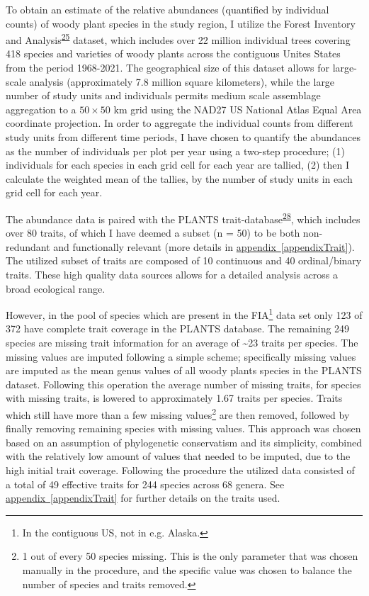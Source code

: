 \documentclass[
  10pt,
]{article}
\newcommand{\aref}[1]{\hyperref[#1]{appendix~\ref*{#1}}}
\begin{document}
To obtain an estimate of the relative abundances (quantified by individual counts) of woody plant species in the study region, I utilize the Forest Inventory and Analysis\textsuperscript{\protect\hyperlink{ref-FIADB}{25}} dataset, which includes over 22 million individual trees covering 418 species and varieties of woody plants across the contiguous Unites States from the period 1968-2021. The geographical size of this dataset allows for large-scale analysis (approximately 7.8 million square kilometers), while the large number of study units and individuals permits medium scale assemblage aggregation to a \(50 \times 50\) km grid using the NAD27 US National Atlas Equal Area coordinate projection. In order to aggregate the individual counts from different study units from different time periods, I have chosen to quantify the abundances as the number of individuals per plot per year using a two-step procedure; (1) individuals for each species in each grid cell for each year are tallied, (2) then I calculate the weighted mean of the tallies, by the number of study units in each grid cell for each year.

The abundance data is paired with the PLANTS trait-database\textsuperscript{\protect\hyperlink{ref-PLANTS}{28}}, which includes over 80 traits, of which I have deemed a subset (n = 50) to be both non-redundant and functionally relevant (more details in \aref{appendixTrait}). The utilized subset of traits are composed of 10 continuous and 40 ordinal/binary traits. These high quality data sources allows for a detailed analysis across a broad ecological range.

However, in the pool of species which are present in the FIA\footnote{In the contiguous US, not in e.g. Alaska.} data set only 123 of 372 have complete trait coverage in the PLANTS database. The remaining 249 species are missing trait information for an average of \textasciitilde23 traits per species. The missing values are imputed following a simple scheme; specifically missing values are imputed as the mean genus values of all woody plants species in the PLANTS dataset. Following this operation the average number of missing traits, for species with missing traits, is lowered to approximately 1.67 traits per species. Traits which still have more than a few missing values\footnote{1 out of every 50 species missing. This is the only parameter that was chosen manually in the procedure, and the specific value was chosen to balance the number of species and traits removed.} are then removed, followed by finally removing remaining species with missing values. This approach was chosen based on an assumption of phylogenetic conservatism and its simplicity, combined with the relatively low amount of values that needed to be imputed, due to the high initial trait coverage. Following the procedure the utilized data consisted of a total of 49 effective traits for 244 species across 68 genera. See \aref{appendixTrait} for further details on the traits used.
\end{document}
